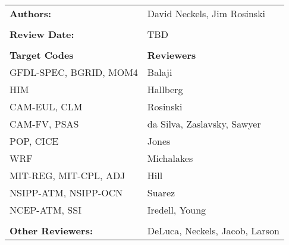 
\begin{tabular}{l l}

{\bf Authors:} & David Neckels, Jim Rosinski \\ \\

{\bf Review Date:}          & TBD \\ \\

{\bf Target Codes}            & {\bf Reviewers} \\
GFDL-SPEC, BGRID, MOM4        & Balaji \\ 
HIM                           & Hallberg \\
CAM-EUL, CLM                  & Rosinski \\
CAM-FV, PSAS                  & da Silva, Zaslavsky, Sawyer\\
POP, CICE                     & Jones \\
WRF                           & Michalakes \\
MIT-REG, MIT-CPL, ADJ         & Hill \\
NSIPP-ATM, NSIPP-OCN          & Suarez \\
NCEP-ATM, SSI                 & Iredell, Young \\ \\

{\bf Other Reviewers:}        & DeLuca, Neckels, Jacob, Larson

\end{tabular}


